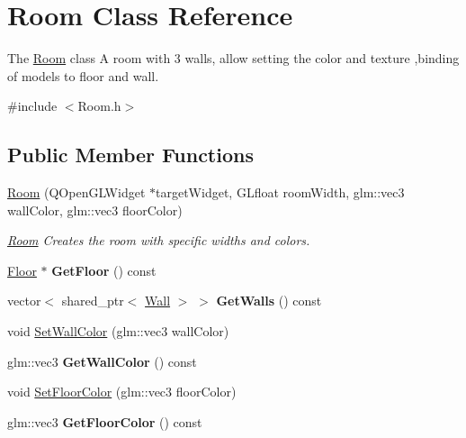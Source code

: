 \hypertarget{class_room}{}\section{Room Class Reference}
\label{class_room}


The \hyperlink{class_room}{Room} class A room with 3 walls, allow setting the color and texture ,binding of models to floor and wall.  




{\ttfamily \#include $<$Room.\+h$>$}

\subsection*{Public Member Functions}
\begin{DoxyCompactItemize}
\item 
\hyperlink{class_room_a7b347765e9501c064013258629b4de19}{Room} (Q\+Open\+G\+L\+Widget $\ast$target\+Widget, G\+Lfloat room\+Width, glm\+::vec3 wall\+Color, glm\+::vec3 floor\+Color)
\begin{DoxyCompactList}\small\item\em \hyperlink{class_room}{Room} Creates the room with specific widths and colors. \end{DoxyCompactList}\item 
\hypertarget{class_room_ae621e50fd276c68af137ab02666dcee8}{}\hyperlink{class_floor}{Floor} $\ast$ {\bfseries Get\+Floor} () const \label{class_room_ae621e50fd276c68af137ab02666dcee8}

\item 
\hypertarget{class_room_a99f66c521d11492e4699a8f9aca6fa25}{}vector$<$ shared\+\_\+ptr$<$ \hyperlink{class_wall}{Wall} $>$ $>$ {\bfseries Get\+Walls} () const \label{class_room_a99f66c521d11492e4699a8f9aca6fa25}

\item 
void \hyperlink{class_room_a0fee2b31c00e8965934ddb0cba8dab9f}{Set\+Wall\+Color} (glm\+::vec3 wall\+Color)
\item 
\hypertarget{class_room_a4a5c9022582a2acaa29196a45c864e6c}{}glm\+::vec3 {\bfseries Get\+Wall\+Color} () const \label{class_room_a4a5c9022582a2acaa29196a45c864e6c}

\item 
void \hyperlink{class_room_a47df29040992bde5444c485b0b942aad}{Set\+Floor\+Color} (glm\+::vec3 floor\+Color)
\item 
\hypertarget{class_room_a92d642a94fd6a2b65094501e17559b48}{}glm\+::vec3 {\bfseries Get\+Floor\+Color} () const \label{class_room_a92d642a94fd6a2b65094501e17559b48}


\end{DoxyCompactItemize}
